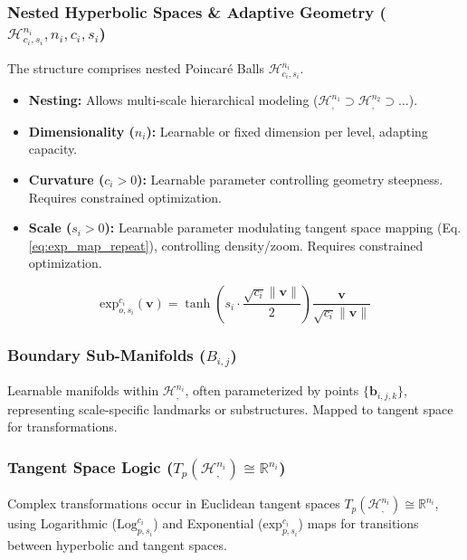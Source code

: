 \documentclass[11pt, twoside]{article} %
\newcommand{\HypSpaceCmd}[3]{\mathcal{H}^{#1}_{#2, #3}} %
\newcommand{\R}{\mathbb{R}} %
\begin{document}
\subsubsection[Nested Hyperbolic Spaces & Adaptive Geometry (H, n, c, s)]{\texorpdfstring{Nested Hyperbolic Spaces \& Adaptive Geometry ($\HypSpaceCmd{n_i}{c_i}{s_i}, n_i, c_i, s_i$)}{Nested Hyperbolic Spaces & Adaptive Geometry (H, n, c, s)}}
\label{ssubsec:nested_hyperbolic}
The structure comprises nested Poincaré Balls $\HypSpaceCmd{n_i}{c_i}{s_i}$.
\begin{itemize}[leftmargin=*, labelsep=5pt]
    \item \textbf{Nesting:} Allows multi-scale hierarchical modeling ($\HypSpaceCmd{n_1}{}{} \supset \HypSpaceCmd{n_2}{}{} \supset \dots$).
    \item \textbf{Dimensionality ($n_i$):} Learnable or fixed dimension per level, adapting capacity.
    \item \textbf{Curvature ($c_i > 0$):} Learnable parameter controlling geometry steepness. Requires constrained optimization.
    \item \textbf{Scale ($s_i > 0$):} Learnable parameter modulating tangent space mapping (Eq. \ref{eq:exp_map_repeat}), controlling density/zoom. Requires constrained optimization.
\end{itemize}
\begin{equation}
    \text{exp}_{o,s_i}^{c_i}(\mathbf{v}) = \tanh\left(s_i \cdot \frac{\sqrt{c_i}\|\mathbf{v}\|}{2}\right) \frac{\mathbf{v}}{\sqrt{c_i}\|\mathbf{v}\|}
    \label{eq:exp_map_repeat} %
\end{equation}

\subsubsection[Boundary Sub-Manifolds (B i,j)]{\texorpdfstring{Boundary Sub-Manifolds ($B_{i,j}$)}{Boundary Sub-Manifolds (B i,j)}}
\label{ssubsec:boundary_manifolds}
Learnable manifolds within $\HypSpaceCmd{n_i}{}{}$, often parameterized by points $\{\mathbf{b}_{i,j,k}\}$, representing scale-specific landmarks or substructures. Mapped to tangent space for transformations.

\subsubsection[Tangent Space Logic (Tp(H ni) approx R ni)]{\texorpdfstring{Tangent Space Logic ($T_p(\HypSpaceCmd{n_i}{}{}) \cong \R^{n_i}$)}{Tangent Space Logic (Tp(H ni) approx R ni)}}
\label{ssubsec:tangent_space}
Complex transformations occur in Euclidean tangent spaces $T_p(\HypSpaceCmd{n_i}{}{}) \cong \R^{n_i}$, using Logarithmic ($\text{Log}^{c_i}_{p,s_i}$) and Exponential ($\text{exp}^{c_i}_{p,s_i}$) maps \cite{KochurovEtAl2020} for transitions between hyperbolic and tangent spaces.
\end{document}
